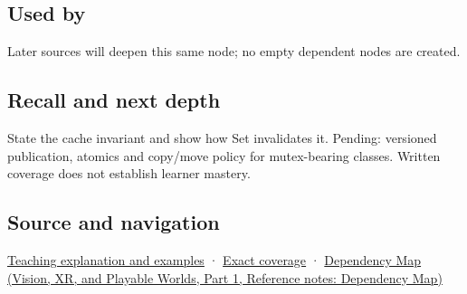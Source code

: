 \subsection{Used by}\label{appendix-f5593256bcaf-used-by}

\hypertarget{appendix-f5593256bcaf-used-by}{}

Later sources will deepen this same node; no empty dependent nodes are created.

\subsection{Recall and next depth}\label{appendix-f5593256bcaf-recall-and-next-depth}

\hypertarget{appendix-f5593256bcaf-recall-and-next-depth}{}

State the cache invariant and show how Set invalidates it. Pending: versioned publication, atomics and copy/move policy for mutex-bearing classes. Written coverage does not establish learner mastery.

\subsection{Source and navigation}\label{appendix-f5593256bcaf-source-and-navigation}

\hypertarget{appendix-f5593256bcaf-source-and-navigation}{}

\hyperref[01-foundations-i-ch003-a-cache-may-change-bits-without-changing-meaning]{Teaching explanation and examples} · \hyperref[appendix-fd090d982a15-m008---parts-113-126]{Exact coverage} · \href{../07-Vision-XR-and-Playable-Worlds-P01/main.pdf\#nameddest=appendix-4ad47bdd269a}{Dependency Map (Vision, XR, and Playable Worlds, Part 1, Reference notes: Dependency Map)}

